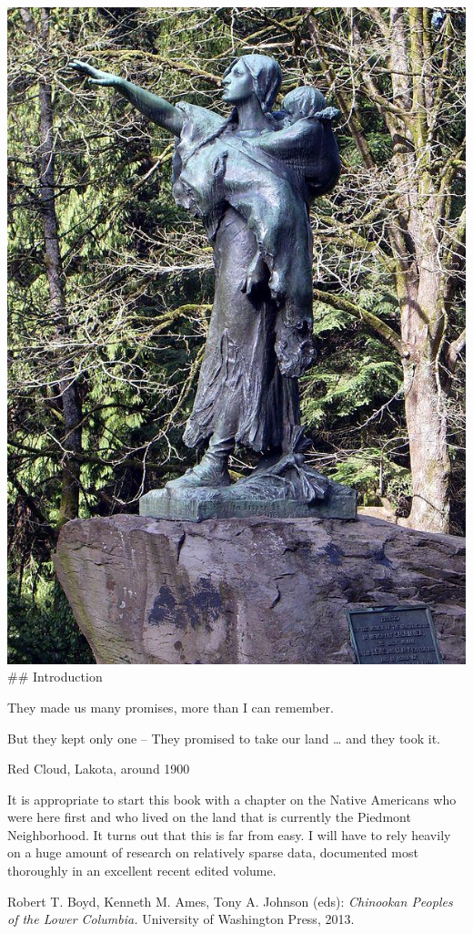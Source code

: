 \documentclass[
  12pt,
]{book}
\begin{document}
\includegraphics{images/01_images/image2.jpg}
\#\# Introduction

They made us many promises, more than I can remember.

But they kept only one -- They promised to take our land \ldots{} and they took it.

Red Cloud, Lakota, around 1900

It is appropriate to start this book with a chapter on the Native Americans who were here first and who lived on the land that is currently the Piedmont Neighborhood. It turns out that this is far from easy. I will have to rely heavily on a huge amount of research on relatively sparse data, documented most thoroughly in an excellent recent edited volume.

Robert T. Boyd, Kenneth M. Ames, Tony A. Johnson (eds): \emph{Chinookan Peoples of the Lower Columbia.} University of Washington Press, 2013.
\end{document}
